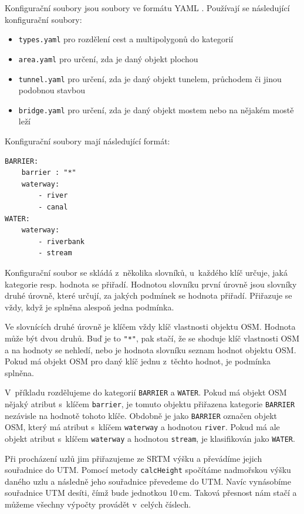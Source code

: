 Konfigurační soubory jsou soubory ve formátu YAML \cite{yamlspec}. Používají se následující
konfigurační soubory:
\begin{itemize}
	\item \verb|types.yaml| pro rozdělení cest a multipolygonů do
kategorií 
	\item \verb|area.yaml| pro určení, zda je daný objekt plochou
	\item \verb|tunnel.yaml| pro určení, zda je daný objekt tunelem,
	průchodem či jinou podobnou stavbou
	\item \verb|bridge.yaml| pro určení, zda je daný objekt mostem nebo na
	nějakém mostě leží
\end{itemize}

Konfigurační soubory mají následující formát:
\begin{verbatim}
BARRIER: 
    barrier : "*"
    waterway:
        - river
        - canal
WATER:
    waterway:
        - riverbank
        - stream
\end{verbatim}
Konfigurační soubor se skládá z~několika slovníků, u~každého klíč určuje, jaká
kategorie resp. hodnota se přiřadí. Hodnotou slovníku první úrovně jsou slovníky
druhé úrovně, které určují, za jakých podmínek se hodnota přiřadí. Přiřazuje se
vždy, když je splněna alespoň jedna podmínka. 

Ve slovnících druhé úrovně je klíčem vždy klíč vlastnosti objektu OSM. Hodnota může
být dvou druhů. Buď je to \verb|"*"|, pak stačí, že se shoduje klíč vlastnosti
OSM a na hodnoty se nehledí, nebo je hodnota slovníku seznam hodnot objektu OSM.
Pokud má objekt OSM pro daný klíč jednu z~těchto hodnot, je  podmínka splněna. 

V~příkladu rozdělujeme do kategorií \verb|BARRIER| a \verb|WATER|. Pokud má
objekt OSM nějaký atribut s~klíčem \verb|barrier|, je tomuto objektu přiřazena
kategorie \verb|BARRIER| nezávisle na hodnotě tohoto klíče. Obdobně je jako
\verb|BARRIER| označen objekt OSM, který má atribut s~klíčem \verb|waterway| a
hodnotou \verb|river|. Pokud má ale objekt atribut s~klíčem \verb|waterway| a
hodnotou \verb|stream|, je klasifikován jako \verb|WATER|.

Při procházení uzlů jim přiřazujeme ze SRTM výšku a převádíme jejich souřadnice
do UTM. Pomocí metody \verb|calcHeight| spočítáme nadmořskou výšku daného uzlu a
následně jeho souřadnice převedeme do UTM. Navíc {\tuc vynásobíme souřadnice UTM
desíti}, čímž bude jednotkou 10\,cm. Taková přesnost nám stačí a můžeme všechny
výpočty provádět v~celých číslech.

